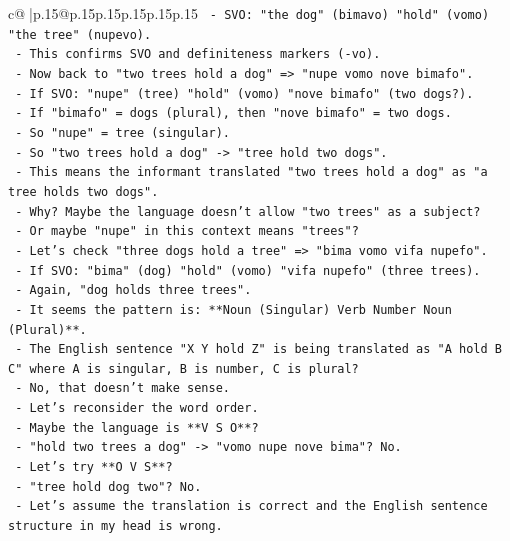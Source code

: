 \documentclass{article}
\begin{document}
{\begin{supertabular}{c@{$\;$}|p{.15\linewidth}@{}p{.15\linewidth}p{.15\linewidth}p{.15\linewidth}p{.15\linewidth}p{.15\linewidth}}
{{{\texttt{           {-} SVO: "the dog" (bimavo) "hold" (vomo) "the tree" (nupevo).} \\
\texttt{           {-} This confirms SVO and definiteness markers ({-}vo).} \\
\texttt{           {-} Now back to "two trees hold a dog" => "nupe vomo nove bimafo".} \\
\texttt{           {-} If SVO: "nupe" (tree) "hold" (vomo) "nove bimafo" (two dogs?).} \\
\texttt{           {-} If "bimafo" = dogs (plural), then "nove bimafo" = two dogs.} \\
\texttt{           {-} So "nupe" = tree (singular).} \\
\texttt{           {-} So "two trees hold a dog" {-}> "tree hold two dogs".} \\
\texttt{           {-} This means the informant translated "two trees hold a dog" as "a tree holds two dogs".} \\
\texttt{           {-} Why? Maybe the language doesn't allow "two trees" as a subject?} \\
\texttt{           {-} Or maybe "nupe" in this context means "trees"?} \\
\texttt{           {-} Let's check "three dogs hold a tree" => "bima vomo vifa nupefo".} \\
\texttt{           {-} If SVO: "bima" (dog) "hold" (vomo) "vifa nupefo" (three trees).} \\
\texttt{           {-} Again, "dog holds three trees".} \\
\texttt{           {-} It seems the pattern is: **Noun (Singular) Verb Number Noun (Plural)**.} \\
\texttt{           {-} The English sentence "X Y hold Z" is being translated as "A hold B C" where A is singular, B is number, C is plural?} \\
\texttt{           {-} No, that doesn't make sense.} \\
\texttt{           {-} Let's reconsider the word order.} \\
\texttt{           {-} Maybe the language is **V S O**?} \\
\texttt{           {-} "hold two trees a dog" {-}> "vomo nupe nove bima"? No.} \\
\texttt{           {-} Let's try **O V S**?} \\
\texttt{           {-} "tree hold dog two"? No.} \\
\texttt{           {-} Let's assume the translation is correct and the English sentence structure in my head is wrong.} \\
}}}
\end{supertabular}}
\end{document}
